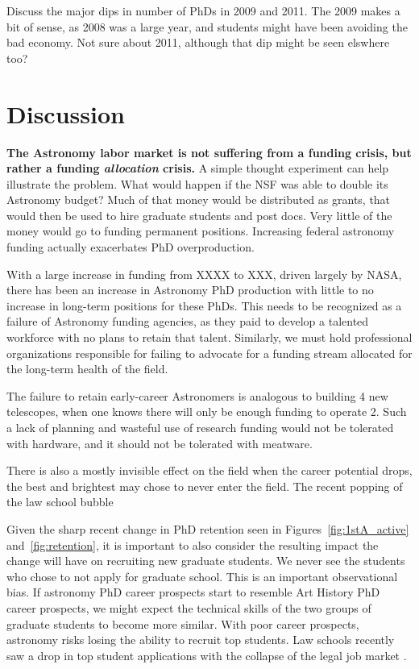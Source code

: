 \documentclass{emulateapj}
\begin{document}
Discuss the major dips in number of PhDs in 2009 and 2011.  The 2009 makes a bit of sense, as 2008 was a large year, and students might have been avoiding the bad economy.  Not sure about 2011, although that dip might be seen elswhere too?

\section{Discussion}

{\bf{The Astronomy labor market is not suffering from a funding crisis, but rather a funding {\emph{allocation}} crisis.}} A simple thought experiment can help illustrate the problem. What would happen if the NSF was able to double its Astronomy budget? Much of that money would be distributed as grants, that would then be used to hire graduate students and post docs. Very little of the money would go to funding permanent positions. Increasing federal astronomy funding actually exacerbates PhD overproduction. 

With a large increase in funding from XXXX to XXX, driven largely by NASA, there has been an increase in Astronomy PhD production with little to no increase in long-term positions for these PhDs.  This needs to be recognized as a failure of Astronomy funding agencies, as they paid to develop a talented workforce with no plans to retain that talent. Similarly, we must hold professional organizations responsible for failing to advocate for a funding stream allocated for the long-term health of the field.  

The failure to retain early-career Astronomers is analogous to building 4 new telescopes, when one knows there will only be enough funding to operate 2.  Such a lack of planning and wasteful use of research funding would not be tolerated with hardware, and it should not be tolerated with meatware. 

There is also a mostly invisible effect on the field when the career potential drops, the best and brightest may chose to never enter the field.  The recent popping of the law school bubble %


Given the sharp recent change in PhD retention seen in Figures~\ref{fig:1stA_active} and~\ref{fig:retention}, it is important to also consider the resulting impact the change will have on recruiting new graduate students. We never see the students who chose to not apply for graduate school. This is an important observational bias.  If astronomy PhD career prospects start to resemble Art History PhD career prospects, we might expect the technical skills of the two groups of graduate students to become more similar.  With poor career prospects, astronomy risks losing the ability to recruit top students. Law schools recently saw a drop in top student applications with the collapse of the legal job market \citep{Weissmann12}.  
\end{document}
